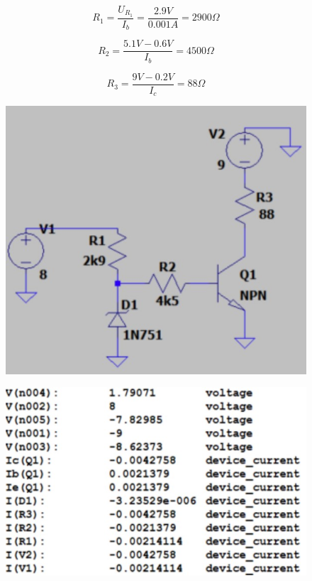 \documentclass{article}
\begin{document}
$$
    R_{1} = \frac{U_{R_{1}}}{I_{b}}=\frac{2.9V}{0.001A}=2900\Omega
$$

$$
    R_{2} = \frac{5.1V-0.6V}{I_{b}}=4500\Omega
$$

$$
    R_{3} = \frac{9V-0.2V}{I_{c}}=88\Omega
$$

\begin{figure}[h!]
    \centering
    \includegraphics[scale=0.35]{rys5_model.jpg}
\end{figure}


\begin{figure}[h!]
    \centering
    \includegraphics[scale=0.5]{rys5_num.jpg}
\end{figure}
\end{document}
